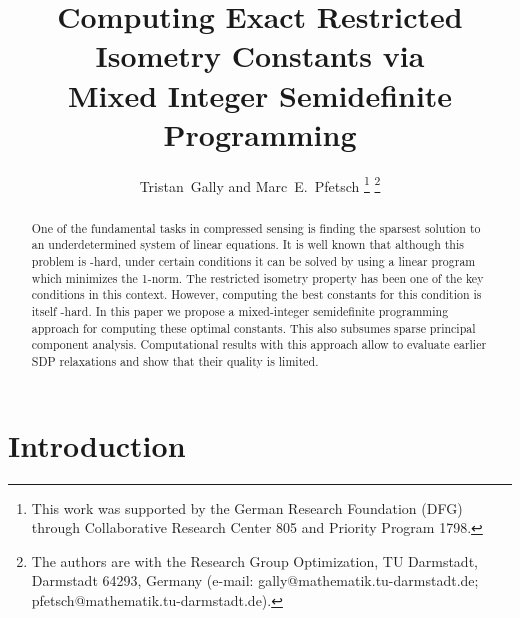 \documentclass[journal]{IEEEtran}
\newcommand{\NP}{\text{NP}}
\begin{document}
\title{Computing Exact Restricted Isometry Constants via\\ Mixed Integer Semidefinite Programming}
\author{Tristan~Gally and Marc~E.~Pfetsch
  \thanks{This work was supported by the German Research Foundation (DFG) through Collaborative Research Center 805 and Priority Program 1798.}
  \thanks{The  authors  are  with  the  Research  Group  Optimization,  TU  Darmstadt,
  Darmstadt  64293,  Germany  (e-mail:  gally@mathematik.tu-darmstadt.de;
  pfetsch@mathematik.tu-darmstadt.de).}}


\maketitle

\noindent
\begin{abstract}
  One of the fundamental tasks in compressed sensing is finding the
  sparsest solution to an underdetermined system of linear equations. It is
  well known that although this problem is \NP-hard, under certain
  conditions it can be solved by using a linear program which minimizes the
  1-norm. The restricted isometry property has been one of the key
  conditions in this context. However, computing the best constants for
  this condition is itself \NP-hard. In this paper we propose a
  mixed-integer semidefinite programming approach for computing these
  optimal constants. This also subsumes sparse principal component
  analysis. Computational results with this approach allow to evaluate
  earlier SDP relaxations and show that their quality is limited.
\end{abstract}

\section{Introduction}
\end{document}
